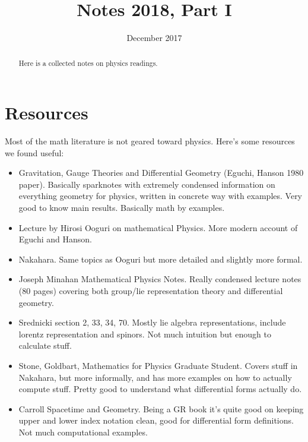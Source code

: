 \documentclass[11pt]{scrartcl}
\begin{document}
	\title{Notes 2018, Part I} %
	\date{December 2017}
	\maketitle
	
	\begin{abstract}
		\sffamily\small
		Here is a collected notes on physics readings.
	\end{abstract}
	
	\vspace{1em}
	
	\tableofcontents
	\newpage


\section{Resources}
Most of the math literature is not geared toward physics.  Here's some resources we found useful:

\begin{itemize}
	\item Gravitation, Gauge Theories and Differential Geometry (Eguchi, Hanson 1980 paper).  Basically sparknotes with extremely condensed information on everything geometry for physics, written in concrete way with examples.  Very good to know main results.  Basically math by examples.
	\item Lecture by Hirosi Ooguri on mathematical Physics.  More modern account of Eguchi and Hanson.
	\item Nakahara.  Same topics as Ooguri but more detailed and slightly more formal.
	\item Joseph Minahan Mathematical Physics Notes.  Really condensed lecture notes (80 pages) covering both group/lie representation theory and differential geometry.
	\item Srednicki section 2, 33, 34, 70.  Mostly lie algebra representations, include lorentz representation and spinors.  Not much intuition but enough to calculate stuff.
	\item Stone, Goldbart, Mathematics for Physics Graduate Student.  Covers stuff in Nakahara, but more informally, and has more examples on how to actually compute stuff.  Pretty good to understand what differential forms actually do.
	\item Carroll Spacetime and Geometry.  Being a GR book it's quite good on keeping upper and lower index notation clean, good for differential form definitions.  Not much computational examples.
\end{itemize}
\end{document}

